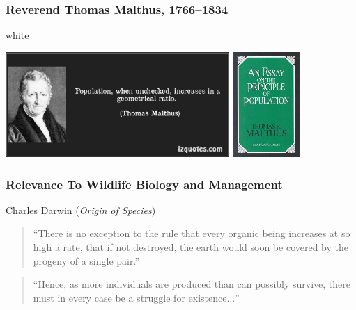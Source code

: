 \documentclass[color=usenames,dvipsnames]{beamer}\usepackage[]{graphicx}\usepackage[]{color}
\begin{document}
\begin{frame}
  \frametitle{Reverend Thomas Malthus, 1766--1834}
  \begin{beamercolorbox}[wd=\paperwidth]{white}
    \begin{center}
      \includegraphics[height=4cm,keepaspectratio]{figs/MalthusGeometric}
      \hspace{0.1cm}
      \includegraphics[height=4cm,keepaspectratio]{figs/MalthusBookCover}
    \end{center}
  \end{beamercolorbox}
\end{frame}


\begin{frame}
  \frametitle{\normalsize Relevance To Wildlife Biology and Management}
  Charles Darwin (\textit{Origin of Species})
  \begin{quote}
    ``There is no exception to the rule that every organic being
    increases at so high a rate, that if not destroyed, the earth
    would soon be covered by the progeny of a single pair.''
  \end{quote}
  \pause
  \vfill
  \begin{quote}
    ``Hence, as more individuals are produced than can possibly survive,
    there must in every case be a struggle for existence$\dots$''
  \end{quote}
\end{frame}
\end{document}
